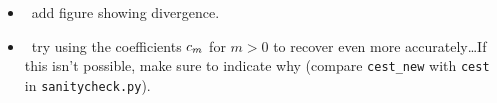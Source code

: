 \begin{itemize}
\item \TODO\ add figure showing divergence.
\item \TODO\ try using the coefficients ${c}_{m}$ for $m>0$ to
  recover even more accurately\ldots If this isn't possible, make sure
  to indicate why (compare \texttt{cest\_new} with \texttt{cest} in
  \texttt{sanitycheck.py}).
\end{itemize}

